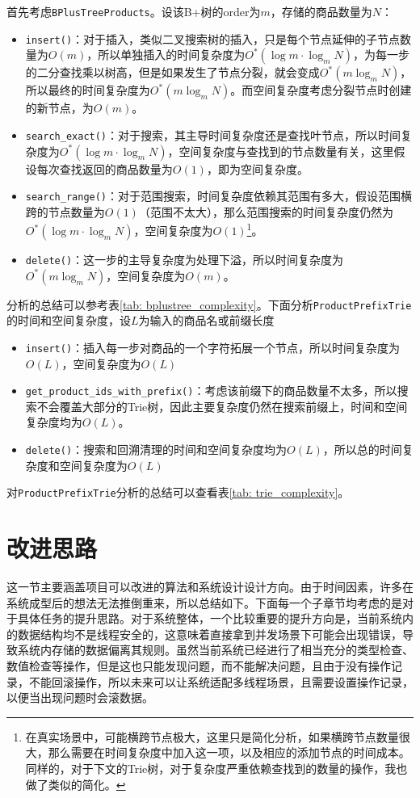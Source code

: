 \documentclass[cn,hazy,blue,10pt,normal]{elegantnote}
\begin{document}
首先考虑\texttt{BPlusTreeProducts}。设该B+树的order为$m$，存储的商品数量为$N$：

\begin{itemize}
    \item \texttt{insert()}：对于插入，类似二叉搜索树的插入，只是每个节点延伸的子节点数量为$O(m)$，所以单独插入的时间复杂度为$O^*(\log m \cdot \log_m N)$，为每一步的二分查找乘以树高，但是如果发生了节点分裂，就会变成$O^*(m\log_m N)$，所以最终的时间复杂度为$O^*(m\log_m N)$。而空间复杂度考虑分裂节点时创建的新节点，为$O(m)$。
    \item \texttt{search\_exact()}：对于搜索，其主导时间复杂度还是查找叶节点，所以时间复杂度为$O^*(\log m \cdot \log_m N)$，空间复杂度与查找到的节点数量有关，这里假设每次查找返回的商品数量为$O(1)$，即为空间复杂度。
    \item \texttt{search\_range()}：对于范围搜索，时间复杂度依赖其范围有多大，假设范围横跨的节点数量为$O(1)$（范围不太大），那么范围搜索的时间复杂度仍然为$O^*(\log m \cdot \log_m N)$，空间复杂度为$O(1)$\footnote{在真实场景中，可能横跨节点极大，这里只是简化分析，如果横跨节点数量很大，那么需要在时间复杂度中加入这一项，以及相应的添加节点的时间成本。同样的，对于下文的Trie树，对于复杂度严重依赖查找到的数量的操作，我也做了类似的简化。}。
    \item \texttt{delete()}：这一步的主导复杂度为处理下溢，所以时间复杂度为$O^*(m\log_m N)$，空间复杂度为$O(m)$。
\end{itemize}

分析的总结可以参考表\ref{tab: bplustree_complexity}。下面分析\texttt{ProductPrefixTrie}的时间和空间复杂度，设$L$为输入的商品名或前缀长度
\begin{itemize}
    \item \texttt{insert()}：插入每一步对商品的一个字符拓展一个节点，所以时间复杂度为$O(L)$，空间复杂度为$O(L)$
    \item \texttt{get\_product\_ids\_with\_prefix()}：考虑该前缀下的商品数量不太多，所以搜索不会覆盖大部分的Trie树，因此主要复杂度仍然在搜索前缀上，时间和空间复杂度均为$O(L)$。
    \item \texttt{delete()}：搜索和回溯清理的时间和空间复杂度均为$O(L)$，所以总的时间复杂度和空间复杂度为$O(L)$
\end{itemize}

对\texttt{ProductPrefixTrie}分析的总结可以查看表\ref{tab: trie_complexity}。

\section{改进思路}
这一节主要涵盖项目可以改进的算法和系统设计设计方向。由于时间因素，许多在系统成型后的想法无法推倒重来，所以总结如下。下面每一个子章节均考虑的是对于具体任务的提升思路。对于系统整体，一个比较重要的提升方向是，当前系统内的数据结构均不是线程安全的，这意味着直接拿到并发场景下可能会出现错误，导致系统内存储的数据偏离其规则。虽然当前系统已经进行了相当充分的类型检查、数值检查等操作，但是这也只能发现问题，而不能解决问题，且由于没有操作记录，不能回滚操作，所以未来可以让系统适配多线程场景，且需要设置操作记录，以便当出现问题时会滚数据。
\label{sec: improvement}
\end{document}
